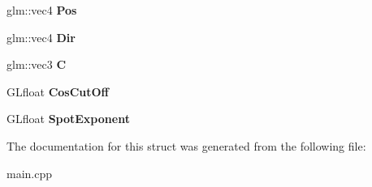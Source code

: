 \begin{DoxyCompactItemize}
\item 
\hypertarget{struct_light_params_ad7dd75d1bf55dd855ced7c5cd48a0a94}{}glm\+::vec4 {\bfseries Pos}\label{struct_light_params_ad7dd75d1bf55dd855ced7c5cd48a0a94}

\item 
\hypertarget{struct_light_params_af3eff9a35c7e1d5606a82bccc1bfeeec}{}glm\+::vec4 {\bfseries Dir}\label{struct_light_params_af3eff9a35c7e1d5606a82bccc1bfeeec}

\item 
\hypertarget{struct_light_params_ab5f4306c4f1c855a4b34b55a91efc8cf}{}glm\+::vec3 {\bfseries C}\label{struct_light_params_ab5f4306c4f1c855a4b34b55a91efc8cf}

\item 
\hypertarget{struct_light_params_aff1247010ed10eb06ff787bfc275dc4b}{}G\+Lfloat {\bfseries Cos\+Cut\+Off}\label{struct_light_params_aff1247010ed10eb06ff787bfc275dc4b}

\item 
\hypertarget{struct_light_params_a29a0354e2f5b4571b6ced4ff281e53c8}{}G\+Lfloat {\bfseries Spot\+Exponent}\label{struct_light_params_a29a0354e2f5b4571b6ced4ff281e53c8}

\end{DoxyCompactItemize}


The documentation for this struct was generated from the following file\+:\begin{DoxyCompactItemize}
\item 
main.\+cpp\end{DoxyCompactItemize}
